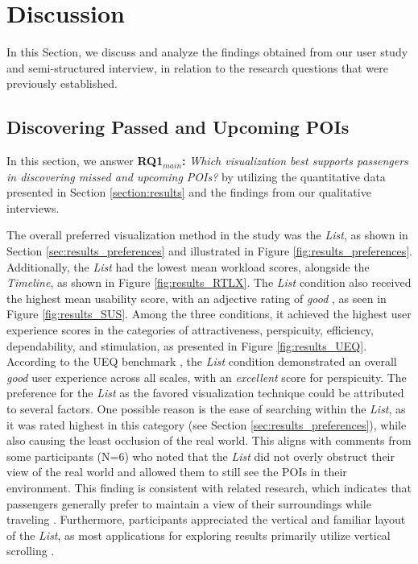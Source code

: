 \section{Discussion}
\label{section:discussion}
In this Section, we discuss and analyze the findings obtained from our user study and semi-structured interview, in relation to the research questions that were previously established.

\subsection{Discovering Passed and Upcoming POIs}
\label{section:discussion_passed_upcoming}
In this section, we answer \textbf{RQ1$_{main}$:} \textit{Which visualization best supports passengers in discovering missed and upcoming POIs?} by utilizing the quantitative data presented in Section \ref{section:results} and the findings from our qualitative interviews.

The overall preferred visualization method in the study was the \textit{List}, as shown in Section \ref{sec:results_preferences} and illustrated in Figure \ref{fig:results_preferences}. Additionally, the \textit{List} had the lowest mean workload scores, alongside the \textit{Timeline}, as shown in Figure \ref{fig:results_RTLX}. The \textit{List} condition also received the highest mean usability score, with an adjective rating of \textit{good} \cite{bangor2009sus}, as seen in Figure \ref{fig:results_SUS}. Among the three conditions, it achieved the highest user experience scores in the categories of attractiveness, perspicuity, efficiency, dependability, and stimulation, as presented in Figure \ref{fig:results_UEQ}. According to the UEQ benchmark \cite{schrepp2017construction}, the \textit{List} condition demonstrated an overall \textit{good} user experience across all scales, with an \textit{excellent} score for perspicuity. The preference for the \textit{List} as the favored visualization technique could be attributed to several factors. One possible reason is the ease of searching within the \textit{List}, as it was rated highest in this category (see Section \ref{sec:results_preferences}), while also causing the least occlusion of the real world. This aligns with comments from some participants (N=6) who noted that the \textit{List} did not overly obstruct their view of the real world and allowed them to still see the POIs in their environment. This finding is consistent with related research, which indicates that passengers generally prefer to maintain a view of their surroundings while traveling \cite{russell2011passengers, hecht2020ndrts, MatsumuraActivePassengering18, BergerGridStudyInCarPassenger2021}. Furthermore, participants appreciated the vertical and familiar layout of the \textit{List}, as most applications for exploring results primarily utilize vertical scrolling \cite{kim2016pagination}.

